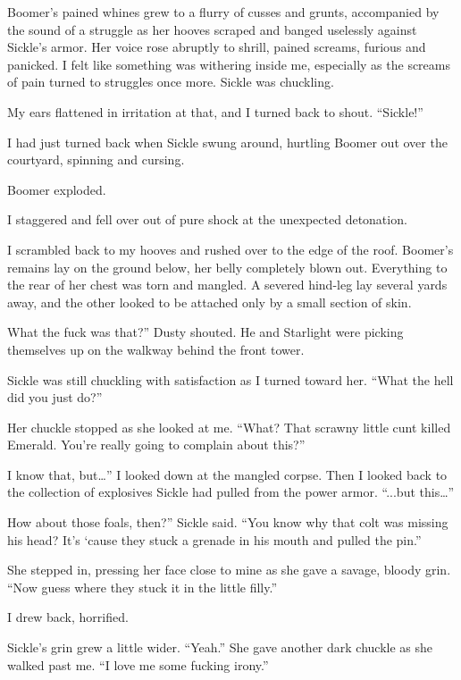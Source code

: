 Boomer’s pained whines grew to a flurry of cusses and grunts, accompanied by the sound of a struggle as her hooves scraped and banged uselessly against Sickle’s armor. Her voice rose abruptly to shrill, pained screams, furious and panicked. I felt like something was withering inside me, especially as the screams of pain turned to struggles once more. Sickle was chuckling.

My ears flattened in irritation at that, and I turned back to shout. “Sickle!”

I had just turned back when Sickle swung around, hurtling Boomer out over the courtyard, spinning and cursing.

Boomer exploded.

I staggered and fell over out of pure shock at the unexpected detonation.

I scrambled back to my hooves and rushed over to the edge of the roof. Boomer’s remains lay on the ground below, her belly completely blown out. Everything to the rear of her chest was torn and mangled. A severed hind-leg lay several yards away, and the other looked to be attached only by a small section of skin.

\leavevmode{}What the fuck was that?” Dusty shouted. He and Starlight were picking themselves up on the walkway behind the front tower.

Sickle was still chuckling with satisfaction as I turned toward her. “What the hell did you just do?”

Her chuckle stopped as she looked at me. “What? That scrawny little cunt killed Emerald. You’re really going to complain about this?”

\leavevmode{}I know that, but…” I looked down at the mangled corpse. Then I looked back to the collection of explosives Sickle had pulled from the power armor. “...but this…”

\leavevmode{}How about those foals, then?” Sickle said. “You know why that colt was missing his head? It’s ‘cause they stuck a grenade in his mouth and pulled the pin.”

She stepped in, pressing her face close to mine as she gave a savage, bloody grin. “Now guess where they stuck it in the little filly.”

I drew back, horrified.

Sickle’s grin grew a little wider. “Yeah.” She gave another dark chuckle as she walked past me. “I love me some fucking irony.”